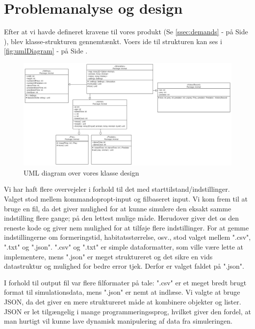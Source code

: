 \documentclass[a4paper]{article}
\newcommand{\namedref}[1]{\autoref{#1} - \nameref{#1} på Side \pageref{#1}}
\begin{document}
  \section{Problemanalyse og design} \label{sec:design}
    Efter at vi havde defineret kravene til vores produkt (Se \namedref{ssec:demands}), blev klasse-strukturen gennemtænkt.
    Voers ide til strukturen kan ses i \namedref{fig:umlDiagram}.

    \begin{figure}[H]
      \centering

      \includegraphics[width=520px]{figures/uml.png}

      \caption{UML diagram over vores klasse design}
      \label{fig:umlDiagram}
    \end{figure}

    Vi har haft flere overvejeler i forhold til  det med 
    starttilstand/indstillinger.
    Valget stod mellem kommandopropt-input og filbaseret input.
    Vi kom frem til at bruge en fil, da det giver mulighed for at kunne 
    simulere den eksakt samme indstilling flere gange; på den lettest mulige 
    måde.
    Herudover giver det os den reneste kode og giver nem mulighed for at 
    tilføje flere indstillinger.
    For at gemme indstillingerne om formeringstid, habitatsstørrelse, osv., 
    stod valget mellem ".csv", ".txt" og ".json".
    ".csv" og ".txt" er simple dataformatter, som ville være lette at 
    implementere, mens ".json" er meget struktureret og det sikre en vids 
    datastruktur og mulighed for bedre error tjek. Derfor er valget faldet på 
    ".json".

    I forhold til output fil var flere filformater på tale: 
    ".csv" er et meget bredt brugt format til simulationsdata,
    mens ".json" er nemt at indlæse. Vi valgte at bruge JSON, da det giver 
    en mere struktureret måde at kombinere objekter og lister. JSON er let 
    tilgængelig i mange programmeringssprog, hvilket giver den fordel, at man 
    hurtigt vil kunne lave dynamisk manipulering af data fra simuleringen.
\end{document}
